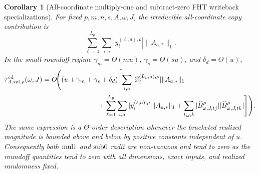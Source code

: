 \documentclass[11pt]{article}
\newtheorem{corollary}[theorem]{Corollary}
\theoremstyle{remark}
\begin{document}
\begin{corollary}[All-coordinate multiply-one and subtract-zero FHT writeback specializations]
For fixed \(p,m,n,s,A,\omega,J\), the irreducible all-coordinate copy
contribution is
\[
  \sum_{\ell=1}^{L_p}\sum_{i,a}
    |y_i^{(\ell,a),\rho}|\|A_{a,*}\|_1 .
\]
In the small-roundoff regime
\(\gamma_m=\Theta(mu)\), \(\gamma_s=\Theta(su)\), and
\(\delta_d=\Theta(u)\),
\begin{align*}
  \tau_{A,{\rm syl},\rho}^{\rm cd}(\omega,J)
  &=
  O\!\Biggl(
    (u+\gamma_m+\gamma_s+\delta_d)
    \Biggl[
      \sum_{i,a}|\widehat x_i^{(L_p,a),\rho}|\|A_{a,*}\|_1\\
  &\hspace{2.8cm}
      +
      \sum_{\ell=1}^{L_p}\sum_{i,a}
        |y_i^{(\ell,a),\rho}|\|A_{a,*}\|_1
      +
      \sum_{t,j,k}
        |\widehat B^\rho_{\omega,J,tj}|
        |\widehat B^\rho_{\omega,J,tk}|
    \Biggr]
  \Biggr).
\end{align*}
The same expression is a \(\Theta\)-order description whenever the bracketed
realized magnitude is bounded above and below by positive constants
independent of \(u\).  Consequently both \({\rm mul1}\) and \({\rm sub0}\)
radii are non-vacuous and tend to zero as the roundoff quantities tend to zero
with all dimensions, exact inputs, and realized randomness fixed.
\end{corollary}
\end{document}
